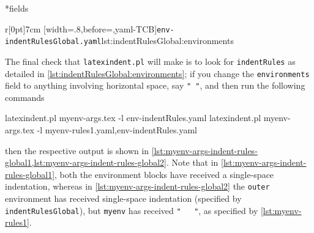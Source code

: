 *{fields}
\begin{wrapfigure}[4]{r}[0pt]{7cm}
[width=.8\linewidth,before=\centering,yaml-TCB]{\texttt{env-indentRulesGlobal.yaml}}{lst:indentRulesGlobal:environments}
\end{wrapfigure}
The final check that \texttt{latexindent.pl} will make is to look for \texttt{indentRules} as detailed in \cref{lst:indentRulesGlobal:environments}; if you change the \texttt{environments}
field to anything involving horizontal space, say \lstinline!" "!, and then run the following commands

\begin{commandshell}
latexindent.pl  myenv-args.tex -l env-indentRules.yaml
latexindent.pl  myenv-args.tex -l myenv-rules1.yaml,env-indentRules.yaml
\end{commandshell}
then the respective output is shown in \cref{lst:myenv-args-indent-rules-global1,lst:myenv-args-indent-rules-global2}. Note that 
in \cref{lst:myenv-args-indent-rules-global1}, both the environment blocks have received a single-space indentation, whereas in 
\cref{lst:myenv-args-indent-rules-global2} the \texttt{outer} environment has received single-space indentation (specified by \texttt{indentRulesGlobal}),
but \texttt{myenv} has received \lstinline!"   "!, as specified by \vref{lst:myenv-rules1}.

\begin{minipage}{.45\textwidth}
\end{minipage}
\hfill
\begin{minipage}{.45\textwidth}
\end{minipage}
